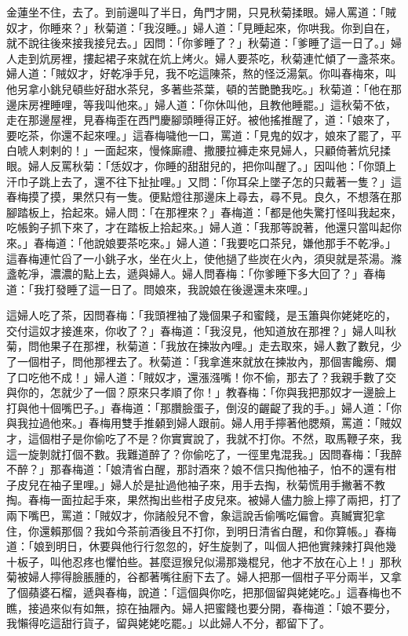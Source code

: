 金蓮坐不住，去了。到前邊叫了半日，角門才開，只見秋菊揉眼。婦人罵道：「賊奴才，你睡來？」秋菊道：「我沒睡。」婦人道：「見睡起來，你哄我。你到自在，就不說往後來接我接兒去。」因問：「你爹睡了？」秋菊道：「爹睡了這一日了。」婦人走到炕房裡，摟起裙子來就在炕上烤火。婦人要茶吃，秋菊連忙傾了一盞茶來。婦人道：「賊奴才，好乾凈手兒，我不吃這陳茶，熬的怪泛湯氣。你叫春梅來，叫他另拿小銚兒頓些好甜水茶兒，多著些茶葉，頓的苦艷艷我吃。」秋菊道：「他在那邊床房裡睡哩，等我叫他來。」婦人道：「你休叫他，且教他睡罷。」這秋菊不依，走在那邊屋裡，見春梅歪在西門慶腳頭睡得正好。被他搖推醒了，道：「娘來了，要吃茶，你還不起來哩。」這春梅噦他一口，罵道：「見鬼的奴才，娘來了罷了，平白唬人剌剌的！」一面起來，慢條廝禮、撒腰拉褲走來見婦人，只顧倚著炕兒揉眼。婦人反罵秋菊：「恁奴才，你睡的甜甜兒的，把你叫醒了。」因叫他：「你頭上汗巾子跳上去了，還不往下扯扯哩。」又問：「你耳朵上墜子怎的只戴著一隻？」這春梅摸了摸，果然只有一隻。便點燈往那邊床上尋去，尋不見。良久，不想落在那腳踏板上，拾起來。婦人問：「在那裡來？」春梅道：「都是他失驚打怪叫我起來，吃帳鉤子抓下來了，才在踏板上拾起來。」婦人道：「我那等說著，他還只當叫起你來。」春梅道：「他說娘要茶吃來。」婦人道：「我要吃口茶兒，嫌他那手不乾凈。」這春梅連忙舀了一小銚子水，坐在火上，使他撾了些炭在火內，須臾就是茶湯。滌盞乾凈，濃濃的點上去，遞與婦人。婦人問春梅：「你爹睡下多大回了？」春梅道：「我打發睡了這一日了。問娘來，我說娘在後邊還未來哩。」

這婦人吃了茶，因問春梅：「我頭裡袖了幾個果子和蜜餞，是玉簫與你姥姥吃的，交付這奴才接進來，你收了？」春梅道：「我沒見，他知道放在那裡？」婦人叫秋菊，問他果子在那裡，秋菊道：「我放在揀妝內哩。」走去取來，婦人數了數兒，少了一個柑子，問他那裡去了。秋菊道：「我拿進來就放在揀妝內，那個害饞癆、爛了口吃他不成！」婦人道：「賊奴才，還漲漒嘴！你不偷，那去了？我親手數了交與你的，怎就少了一個？原來只孝順了你！」教春梅：「你與我把那奴才一邊臉上打與他十個嘴巴子。」春梅道：「那臢臉蛋子，倒沒的齷齪了我的手。」婦人道：「你與我拉過他來。」春梅用雙手推顙到婦人跟前。婦人用手擰著他腮頰，罵道：「賊奴才，這個柑子是你偷吃了不是？你實實說了，我就不打你。不然，取馬鞭子來，我這一旋剝就打個不數。我難道醉了？你偷吃了，一徑里鬼混我。」因問春梅：「我醉不醉？」那春梅道：「娘清省白醒，那討酒來？娘不信只掏他袖子，怕不的還有柑子皮兒在袖子里哩。」婦人於是扯過他袖子來，用手去掏，秋菊慌用手撇著不教掏。春梅一面拉起手來，果然掏出些柑子皮兒來。被婦人儘力臉上擰了兩把，打了兩下嘴巴，罵道：「賊奴才，你諸般兒不會，象這說舌偷嘴吃偏會。真贓實犯拿住，你還賴那個？我如今茶前酒後且不打你，到明日清省白醒，和你算帳。」春梅道：「娘到明日，休要與他行行忽忽的，好生旋剝了，叫個人把他實辣辣打與他幾十板子，叫他忍疼也懼怕些。甚麼逗猴兒似湯那幾棍兒，他才不放在心上！」那秋菊被婦人擰得臉脹腫的，谷都著嘴往廚下去了。婦人把那一個柑子平分兩半，又拿了個蘋婆石榴，遞與春梅，說道：「這個與你吃，把那個留與姥姥吃。」這春梅也不瞧，接過來似有如無，掠在抽屜內。婦人把蜜餞也要分開，春梅道：「娘不要分，我懶得吃這甜行貨子，留與姥姥吃罷。」以此婦人不分，都留下了。

